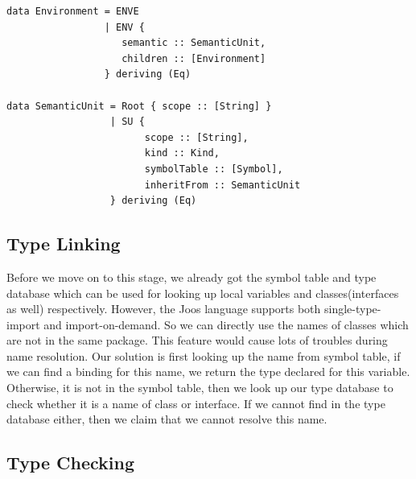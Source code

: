 \documentclass[12pt,letterpaper]{article}
\begin{document}
\begin{lstlisting}
data Environment = ENVE
                 | ENV {
                    semantic :: SemanticUnit,
                    children :: [Environment]
                 } deriving (Eq)

data SemanticUnit = Root { scope :: [String] }
                  | SU {
                        scope :: [String],
                        kind :: Kind,
                        symbolTable :: [Symbol],
                        inheritFrom :: SemanticUnit
                  } deriving (Eq)
\end{lstlisting}




\subsection{Type Linking}

Before we move on to this stage, we already got the symbol table and type database which can be used for looking up local variables and classes(interfaces as well) respectively.
However, the Joos language supports both single-type-import and import-on-demand.
So we can directly use the names of classes which are not in the same package.
This feature would cause lots of troubles during name resolution.
Our solution is first looking up the name from symbol table, if we can find a binding for this name, we return the type declared for this variable.
Otherwise, it is not in the symbol table, then we look up our type database to check whether it is a name of class or interface.
If we cannot find in the type database either, then we claim that we cannot resolve this name.



\subsection{Type Checking}
\end{document}
